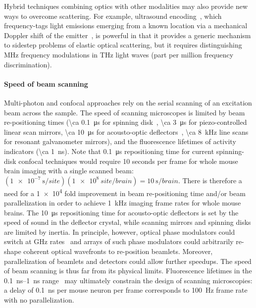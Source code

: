 Hybrid techniques combining optics with other modalities may also provide new ways to overcome scattering.
For example, ultrasound encoding~\cite{wang12}, which frequency-tags light emissions emerging from a known location via a mechanical Doppler shift of the emitter~\cite{mahan98}, is powerful in that it provides a generic mechanism to sidestep problems of elastic optical scattering, but it requires distinguishing MHz frequency modulations in THz light waves (part per million frequency discrimination).

\paragraph{Speed of beam scanning}
Multi-photon and confocal approaches rely on the serial scanning of an excitation beam across the sample.
The speed of scanning microscopes is limited by beam re-positioning times (\SI{\ca 0.1}{\micro\second} for spinning disk~\cite{mahalati13,kang10,flusberg05}, \SI{\ca 3}{\micro\second} for piezo-controlled linear scan mirrors, \SI{\ca 10}{\micro\second} for acousto-optic deflectors~\cite{vucinic07}, \SI{\ca 8}{\kilo\hertz} line scans for resonant galvanometer mirrors), and the fluorescence lifetimes of activity indicators (\SI{\ca 1}{\nano\second}).
Note that \SI{0.1}{\micro\second} repositioning time for current spinning-disk confocal techniques would require 10 seconds per frame for whole mouse brain imaging with a single scanned beam: $\left(\SI{1e-7}{\second\per site}\right)\left(\SI{1e8}{site\per brain}\right) = \SI{10}{\second\per brain}$. There is therefore a need for a \num{1e4} fold improvement in beam re-positioning time and/or beam parallelization in order to achieve \SI{1}{\kilo\hertz} imaging frame rates for whole mouse brains.
The \SI{10}{\micro\second} repositioning time for acousto-optic deflectors is set by the speed of sound in the deflector crystal, while scanning mirrors and spinning disks are limited by inertia.
In principle, however, optical phase modulators could switch at GHz rates~\cite{alivisatos13} and arrays of such phase modulators could arbitrarily re-shape coherent optical wavefronts to re-position beamlets.
Moreover, parallelization of beamlets and detectors could allow further speedups.
The speed of beam scanning is thus far from its physical limits.
Fluorescence lifetimes in the \SIrange{0.1}{1}{\nano\second} range~\cite{striker99} may ultimately constrain the design of scanning microscopies: a delay of \SI{0.1}{\nano\second} per mouse neuron per frame corresponds to \SI{100}{\hertz} frame rate with no parallelization.

